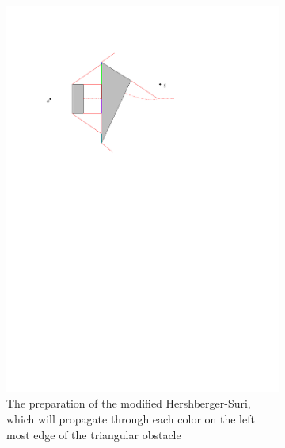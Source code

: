 \begin{figure}[H]
\centering
\begin{subfigure}{.5\textwidth}
  \centering
  \includegraphics[width=.95\linewidth]{figures/spm0projection.pdf}
  \caption{The preparation of the modified Hershberger-Suri, which will propagate through each 
  		   color on the left most edge of the triangular obstacle}
  \label{fig:spm0projection}
\end{subfigure}%
\begin{subfigure}{.5\textwidth}
  \centering

\end{subfigure}
\end{figure}
